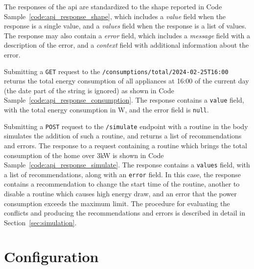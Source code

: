 

The responses of the \acrshort{api} are standardized to the shape reported in Code Sample~\ref{code:api_response_shape}, which includes a \textit{value} field when the response is a single value, and a \textit{values} field when the response is a list of values. The response may also contain a \textit{error} field, which includes a \textit{message} field with a description of the error, and a \textit{context} field with additional information about the error.



Submitting a \texttt{GET} request to the \texttt{/consumptions/total/2024-02-25T16:00} returns the total energy consumption of all appliances at 16:00 of the current day (the date part of the string is ignored) as shown in Code Sample~\ref{code:api_response_consumption}. The response contains a \texttt{value} field, with the total energy consumption in W, and the error field is \texttt{null}.



Submitting a \texttt{POST} request to the \texttt{/simulate} endpoint with a routine in the body simulates the addition of such a routine, and returns a list of recommendations and errors. The response to a request containing a routine which brings the total consumption of the home over 3kW is shown in Code Sample~\ref{code:api_response_simulate}. The response contains a \texttt{values} field, with a list of recommendations, along with an \texttt{error} field. In this case, the response contains a recommendation to change the start time of the routine, another to disable a routine which causes high energy draw, and an error that the power consumption exceeds the maximum limit. The procedure for evaluating the conflicts and producing the recommendations and errors is described in detail in Section~\ref{sec:simulation}.

\section{Configuration}




